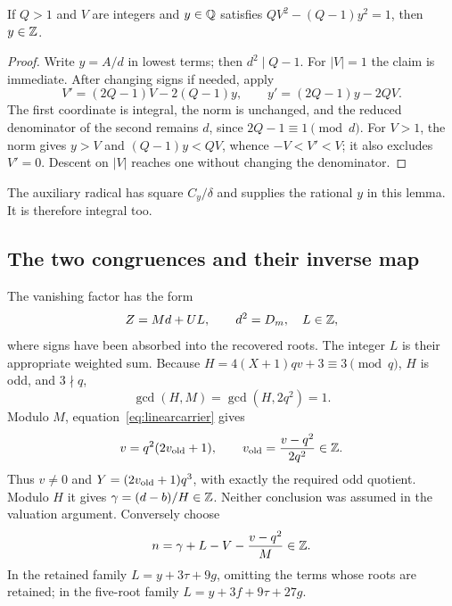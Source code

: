\begin{lemma}\label{lem:descent}
If $Q>1$ and $V$ are integers and $y\in\mathbb Q$ satisfies
$QV^2-(Q-1)y^2=1$, then $y\in\mathbb Z$.
\end{lemma}
\begin{proof}
Write $y=A/d$ in lowest terms; then $d^2\mid Q-1$.
For $|V|=1$ the claim is immediate. After changing signs if needed, apply
\[
 V'=(2Q-1)V-2(Q-1)y,\qquad y'=(2Q-1)y-2QV.
\]
The first coordinate is integral, the norm is unchanged, and the reduced
denominator of the second remains $d$, since $2Q-1\equiv1\pmod d$.
For $V>1$, the norm gives $y>V$ and $(Q-1)y<QV$, whence
$-V<V'<V$; it also excludes $V'=0$. Descent on $|V|$ reaches one
without changing the denominator.
\end{proof}
The auxiliary radical has square $C_y/\delta$ and supplies the rational
$y$ in this lemma. It is therefore integral too.

\subsection{The two congruences and their inverse map}
The vanishing factor has the form
\begin{equation}
 Z=Md+UL,\qquad d^2=D_m,\quad L\in\mathbb Z,\label{eq:linearcarrier}
\end{equation}
where signs have been absorbed into the recovered roots. The integer
$L$ is their appropriate weighted sum. Because
$H=4(X+1)qv+3\equiv3\pmod q$, $H$ is odd, and $3\nmid q$,
\[
 \gcd(H,M)=\gcd(H,2q^2)=1.
\]
Modulo $M$, equation~\eqref{eq:linearcarrier} gives
\[
 v=q^2(2v_{\rm old}+1),\qquad
 v_{\rm old}=\frac{v-q^2}{2q^2}\in\mathbb Z.
\]
Thus $v\ne0$ and $Y=(2v_{\rm old}+1)q^3$, with exactly the required
odd quotient. Modulo $H$ it gives
$\gamma=(d-b)/H\in\mathbb Z$. Neither conclusion was assumed in the
valuation argument. Conversely choose
\begin{equation}
 n=\gamma+L-V-\frac{v-q^2}{M}\in\mathbb Z.\label{eq:choose-n}
\end{equation}
In the retained family $L=y+3\tau+9g$, omitting the terms whose roots
are retained; in the five-root family $L=y+3f+9\tau+27g$.

